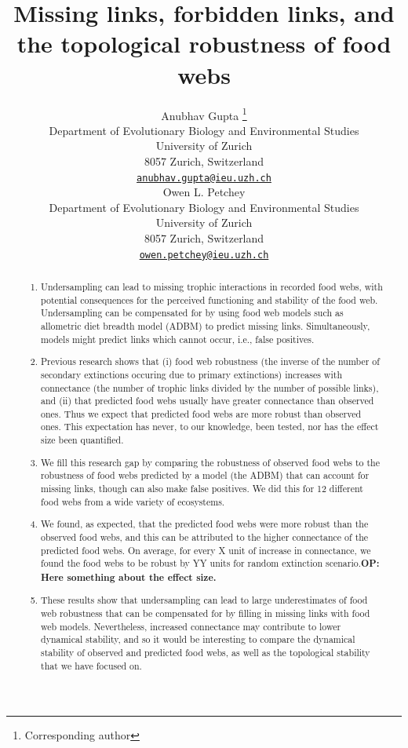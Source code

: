 \documentclass{article}
\title{Missing links, forbidden links, and the topological robustness of
food webs}
\author{
    Anubhav Gupta
    \thanks{Corresponding author}
   \\
    Department of Evolutionary Biology and Environmental Studies \\
    University of Zurich \\
  8057 Zurich, Switzerland \\
  \texttt{\href{mailto:anubhav.gupta@ieu.uzh.ch}{\nolinkurl{anubhav.gupta@ieu.uzh.ch}}} \\
   \And
    Owen L. Petchey
   \\
    Department of Evolutionary Biology and Environmental Studies \\
    University of Zurich \\
  8057 Zurich, Switzerland \\
  \texttt{\href{mailto:owen.petchey@ieu.uzh.ch}{\nolinkurl{owen.petchey@ieu.uzh.ch}}} \\
  }
\providecommand{\tightlist}{%
  \setlength{\itemsep}{0pt}\setlength{\parskip}{0pt}}
\begin{document}
\maketitle


\begin{abstract}
\begin{enumerate}
\def\labelenumi{\arabic{enumi})}
\tightlist
\item
  Undersampling can lead to missing trophic interactions in recorded
  food webs, with potential consequences for the perceived functioning
  and stability of the food web. Undersampling can be compensated for by
  using food web models such as allometric diet breadth model (ADBM) to
  predict missing links. Simultaneously, models might predict links
  which cannot occur, i.e., false positives.
\item
  Previous research shows that (i) food web robustness (the inverse of
  the number of secondary extinctions occuring due to primary
  extinctions) increases with connectance (the number of trophic links
  divided by the number of possible links), and (ii) that predicted food
  webs usually have greater connectance than observed ones. Thus we
  expect that predicted food webs are more robust than observed ones.
  This expectation has never, to our knowledge, been tested, nor has the
  effect size been quantified.
\item
  We fill this research gap by comparing the robustness of observed food
  webs to the robustness of food webs predicted by a model (the ADBM)
  that can account for missing links, though can also make false
  positives. We did this for 12 different food webs from a wide variety
  of ecosystems.
\item
  We found, as expected, that the predicted food webs were more robust
  than the observed food webs, and this can be attributed to the higher
  connectance of the predicted food webs. On average, for every X unit
  of increase in connectance, we found the food webs to be robust by YY
  units for random extinction scenario.\textbf{OP: Here something about
  the effect size.}
\item
  These results show that undersampling can lead to large underestimates
  of food web robustness that can be compensated for by filling in
  missing links with food web models. Nevertheless, increased
  connectance may contribute to lower dynamical stability, and so it
  would be interesting to compare the dynamical stability of observed
  and predicted food webs, as well as the topological stability that we
  have focused on.
\end{enumerate}
\end{abstract}
\end{document}
